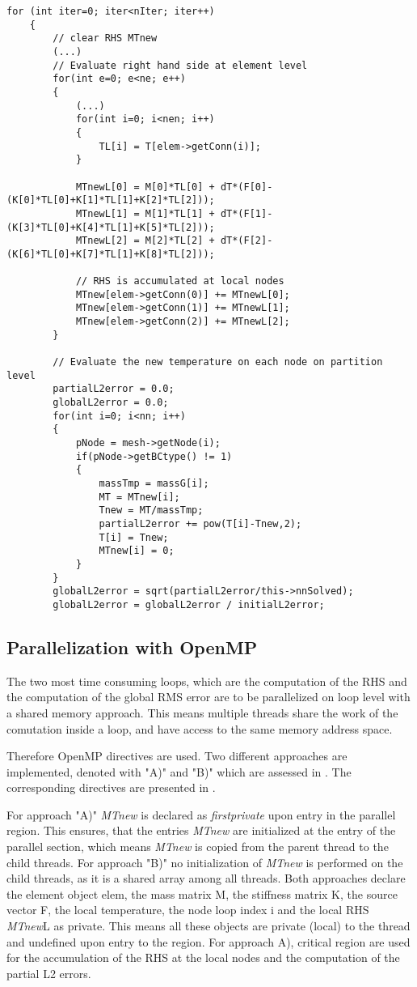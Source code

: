 \begin{lstlisting}[caption={\label{Code:Serial2} Explicit Solver}]
	for (int iter=0; iter<nIter; iter++)
	{
		// clear RHS MTnew
		(...)
		// Evaluate right hand side at element level
		for(int e=0; e<ne; e++)
		{
			(...)
			for(int i=0; i<nen; i++)
			{
				TL[i] = T[elem->getConn(i)];
			}
			
			MTnewL[0] = M[0]*TL[0] + dT*(F[0]-(K[0]*TL[0]+K[1]*TL[1]+K[2]*TL[2]));
			MTnewL[1] = M[1]*TL[1] + dT*(F[1]-(K[3]*TL[0]+K[4]*TL[1]+K[5]*TL[2]));
			MTnewL[2] = M[2]*TL[2] + dT*(F[2]-(K[6]*TL[0]+K[7]*TL[1]+K[8]*TL[2]));
			
			// RHS is accumulated at local nodes
			MTnew[elem->getConn(0)] += MTnewL[0];
			MTnew[elem->getConn(1)] += MTnewL[1];
			MTnew[elem->getConn(2)] += MTnewL[2];
		}
		
		// Evaluate the new temperature on each node on partition level
		partialL2error = 0.0;
		globalL2error = 0.0;
		for(int i=0; i<nn; i++)
		{
			pNode = mesh->getNode(i);
			if(pNode->getBCtype() != 1)
			{
				massTmp = massG[i];
				MT = MTnew[i];
				Tnew = MT/massTmp;
				partialL2error += pow(T[i]-Tnew,2);
				T[i] = Tnew;
				MTnew[i] = 0;
			}
		}
		globalL2error = sqrt(partialL2error/this->nnSolved);
		globalL2error = globalL2error / initialL2error;
\end{lstlisting}

\subsection{Parallelization with OpenMP \label{sec:POpenMP}}

The two most time consuming loops, which are the computation of the RHS and the computation of the global RMS error are to be parallelized on loop level with a shared memory approach. This means multiple threads share the work of the comutation inside a loop, and have access to the same memory address space.

Therefore OpenMP directives are used. Two different approaches are implemented, denoted with "A)" and "B)" which are assessed in . The corresponding directives are presented in .

For approach "A)" \textit{MTnew} is declared as \textit{firstprivate} upon entry in the parallel region. This ensures, that the entries \textit{MTnew} are initialized at the entry of the parallel section, which means \textit{MTnew} is copied from the parent thread to the child threads. For approach "B)" no initialization of \textit{MTnew} is performed on the child threads, as it is a shared array among all threads. Both approaches declare the element object elem, the mass matrix M, the stiffness matrix K, the source vector F, the local temperature, the node loop index i and the local RHS \textit{MTnew}L as private. This means all these objects are private (local) to the thread and undefined upon entry to the region. For approach A), critical region are used for the accumulation of the RHS at the local nodes and the computation of the partial L2 errors. 

